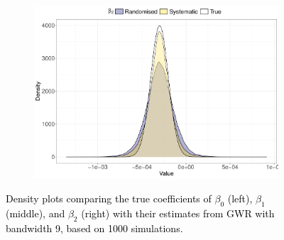 \documentclass[a4paper]{article} 	%
\newcommand{\revision}[1]{\textcolor{black}{#1}}
\newcommand{\zc}[1]{\textcolor{black}{#1}}
\begin{document}
\begin{figure}[!htp]
\begin{subfigure}[b]{0.32\textwidth}
        \includegraphics[width=\textwidth]{density_mat_1k_b2.pdf}
        \label{fig:beta2_mat}
    \end{subfigure}
    \caption{\zc{Density plots comparing the true coefficients of $\beta_0$ (left), $\beta_1$ (middle), and $\beta_2$ (right) with their estimates from GWR with bandwidth 9, based on 1000 simulations.}}
    \label{fig:combinedbeta_mat}
\end{figure}







\end{document}
